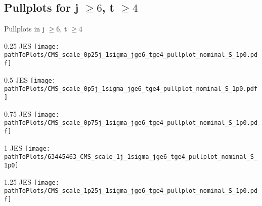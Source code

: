 \subsection{Pullplots for j $\geq 6$, t $\geq 4$}
\begin{frame}{Pullplots in j $\geq 6$, t $\geq 4$}
\begin{minipage}{0.25\textwidth}
\begin{block}{\num{0.25} JES}
\texttt{[image: \\pathToPlots/CMS\_scale\_0p25j\_1sigma\_jge6\_tge4\_pullplot\_nominal\_S\_1p0.pdf]}\\
\end{block}

\end{minipage}
\hfill
\begin{minipage}{0.25\textwidth}
\begin{block}{\num{0.5} JES}
\texttt{[image: \\pathToPlots/CMS\_scale\_0p5j\_1sigma\_jge6\_tge4\_pullplot\_nominal\_S\_1p0.pdf]}\\
\end{block}

\end{minipage}
\hfill
\begin{minipage}{0.25\textwidth}
\begin{block}{\num{0.75} JES}
\texttt{[image: \\pathToPlots/CMS\_scale\_0p75j\_1sigma\_jge6\_tge4\_pullplot\_nominal\_S\_1p0.pdf]}\\
\end{block}
\end{minipage}
\hfill

\begin{minipage}{0.25\textwidth}
\begin{block}{1 JES}
\texttt{[image: \\pathToPlots/63445463\_CMS\_scale\_1j\_1sigma\_jge6\_tge4\_pullplot\_nominal\_S\_1p0]}\\
\end{block}

\end{minipage}
\hfill
\begin{minipage}{0.25\textwidth}
\begin{block}{\num{1.25} JES}
\texttt{[image: \\pathToPlots/CMS\_scale\_1p25j\_1sigma\_jge6\_tge4\_pullplot\_nominal\_S\_1p0.pdf]}\\
\end{block}
\end{minipage}
\end{frame}


